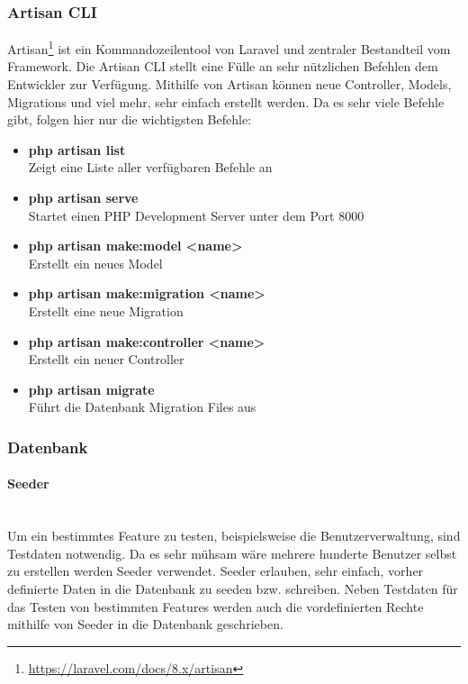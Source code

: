 \subsubsection{Artisan CLI}
Artisan\footnote{\url{https://laravel.com/docs/8.x/artisan}} ist ein Kommandozeilentool von Laravel und zentraler Bestandteil vom Framework. Die
Artisan CLI
stellt eine Fülle an sehr nützlichen Befehlen dem Entwickler zur Verfügung.
Mithilfe von Artisan können neue Controller, Models, Migrations und viel mehr, sehr
einfach erstellt werden. Da es sehr viele Befehle gibt, folgen hier nur die
wichtigsten Befehle:

\begin{itemize}
  \item \textbf{php artisan list}\\
  Zeigt eine Liste aller verfügbaren Befehle an
  \item \textbf{php artisan serve}\\
  Startet einen PHP Development Server unter dem Port 8000
  \item \textbf{php artisan make:model <name>}\\
  Erstellt ein neues Model
  \item \textbf{php artisan make:migration <name>}\\
  Erstellt eine neue Migration
  \item \textbf{php artisan make:controller <name>}\\
  Erstellt ein neuer Controller
  \item \textbf{php artisan migrate}\\
  Führt die Datenbank Migration Files aus
\end{itemize}

\subsubsection{Datenbank}

\paragraph{Seeder}\mbox{}\\
Um ein bestimmtes Feature zu testen, beispielsweise die Benutzerverwaltung, sind
Testdaten notwendig. Da es sehr mühsam wäre mehrere hunderte Benutzer selbst zu
erstellen werden Seeder verwendet. Seeder erlauben, sehr einfach, vorher
definierte Daten in die Datenbank zu seeden bzw. schreiben. Neben Testdaten für
das Testen von bestimmten Features werden auch die vordefinierten Rechte
mithilfe von Seeder in die Datenbank geschrieben.\\

